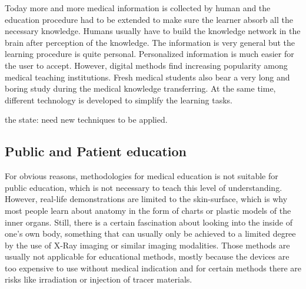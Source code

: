 \RA Today more and more medical information is collected by human and the education procedure had to be extended to make sure the learner absorb all the necessary knowledge. Humans usually have to build the knowledge network in the brain after perception of the knowledge. The information is very general but the learning procedure is quite personal. Personalized information is much easier for the user to accept. However, digital methods find increasing popularity among medical teaching institutions.
Fresh medical students also bear a very long and boring study during the medical knowledge transferring. At the same time, different technology is developed to simplify the learning tasks.

the state: need new techniques to be applied.
\subsection{Public and Patient education}
For obvious reasons, methodologies for medical education is not suitable for public education, which is not necessary to teach this level of understanding. 
However, real-life demonstrations are limited to the skin-surface, which is why most people learn about anatomy in the form of charts or plastic models of the inner organs. Still, there is a certain fascination about looking into the inside of one's own body, something that can usually only be achieved to a limited degree by the use of X-Ray imaging or similar imaging modalities. Those methods are usually not applicable for educational methods, mostly because the devices are too expensive to use without medical indication and for certain methods there are risks like irradiation or injection of tracer materials.

